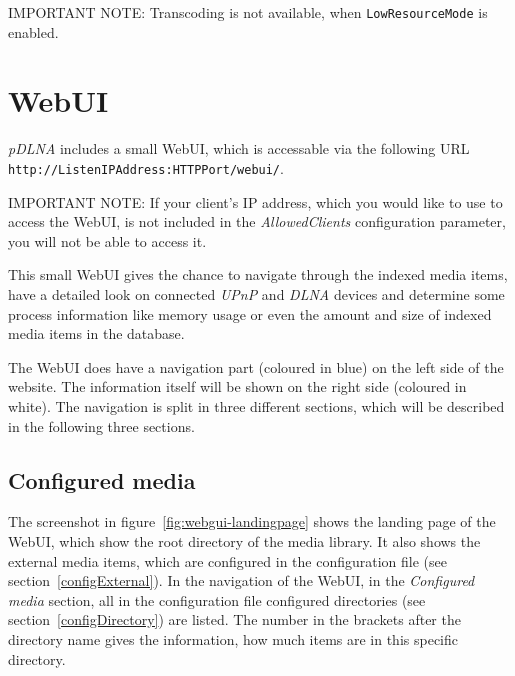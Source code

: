 \documentclass[a4paper,oneside,10pt]{report}
\newenvironment{colframeimportantnote}{%
  \begin{Sbox}
    \begin{minipage}{.99\columnwidth}
}{%
  \end{minipage}
  \end{Sbox}
  \begin{center}
    \fcolorbox{black}{Orange}{\TheSbox}
  \end{center}
}
\begin{document}
\begin{colframeimportantnote}
\textsc{IMPORTANT NOTE:} Transcoding is not available, when \verb|LowResourceMode| is enabled.
\end{colframeimportantnote}

%
%

\chapter{WebUI}
\label{webui}

{\em pDLNA} includes a small WebUI, which is accessable via the following URL \verb|http://ListenIPAddress:HTTPPort/webui/|.

\begin{colframeimportantnote}
\textsc{IMPORTANT NOTE:} If your client's IP address, which you would like to use to access the WebUI, is not included in the {\em AllowedClients} configuration parameter, you will not be able to access it.
\end{colframeimportantnote}

This small WebUI gives the chance to navigate through the indexed media items, have a detailed look on connected {\em UPnP} and {\em DLNA} devices and determine some process information like memory usage or even the amount and size of indexed media items in the database.

The WebUI does have a navigation part (coloured in blue) on the left side of the website. The information itself will be shown on the right side (coloured in white). The navigation is split in three different sections, which will be described in the following three sections.

\section{Configured media}

The screenshot in figure~\ref{fig:webgui-landingpage} shows the landing page of the WebUI, which show the root directory of the media library. It also shows the external media items, which are configured in the configuration file (see section~\ref{configExternal}). In the navigation of the WebUI, in the {\em Configured media} section, all in the configuration file configured directories (see section~\ref{configDirectory}) are listed. The number in the brackets after the directory name gives the information, how much items are in this specific directory.
\end{document}

